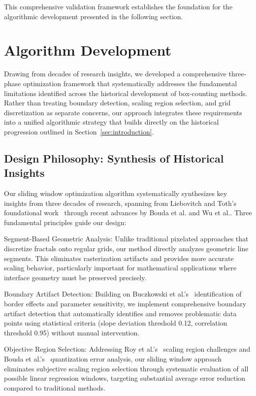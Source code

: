\documentclass[preprint,12pt]{elsarticle}
\def\textbf#1{#1}%
\begin{document}
This comprehensive validation framework establishes the foundation for the algorithmic development presented in the following section.

\section{Algorithm Development}
\label{sec:algorithm}

Drawing from decades of research insights, we developed a comprehensive three-phase optimization framework that systematically addresses the fundamental limitations identified across the historical development of box-counting methods. Rather than treating boundary detection, scaling region selection, and grid discretization as separate concerns, our approach integrates these requirements into a unified algorithmic strategy that builds directly on the historical progression outlined in Section~\ref{sec:introduction}.

\subsection{Design Philosophy: Synthesis of Historical Insights}

Our sliding window optimization algorithm systematically synthesizes key insights from three decades of research, spanning from Liebovitch and Toth's foundational work~\cite{liebovitch1989} through recent advances by Bouda et al.\cite{bouda2016} and Wu et al.\cite{wu2020}. Three fundamental principles guide our design:

\textbf{Segment-Based Geometric Analysis}: Unlike traditional pixelated approaches that discretize fractals onto regular grids, our method directly analyzes geometric line segments. This eliminates rasterization artifacts and provides more accurate scaling behavior, particularly important for mathematical applications where interface geometry must be preserved precisely.

\textbf{Boundary Artifact Detection}: Building on Buczkowski et al.'s~\cite{buczkowski1998} identification of border effects and parameter sensitivity, we implement comprehensive boundary artifact detection that automatically identifies and removes problematic data points using statistical criteria (slope deviation threshold 0.12, correlation threshold 0.95) without manual intervention.

\textbf{Objective Region Selection}: Addressing Roy et al.'s~\cite{roy2007} scaling region challenges and Bouda et al.'s~\cite{bouda2016} quantization error analysis, our sliding window approach eliminates subjective scaling region selection through systematic evaluation of all possible linear regression windows, targeting substantial average error reduction compared to traditional methods.
\end{document}
